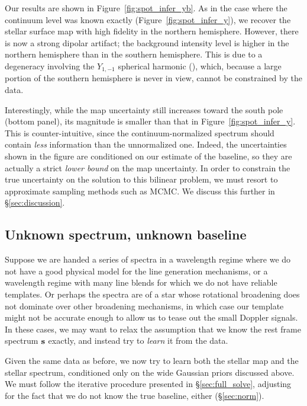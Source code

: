 \documentclass[modern]{aastex631}
\begin{document}
Our results are shown in Figure~\ref{fig:spot_infer_yb}. As in the case where the continuum level was known exactly (Figure~\ref{fig:spot_infer_y}), we recover the stellar surface map with high fidelity in the northern hemisphere. However, there is now a strong dipolar artifact; the background intensity level is higher in the northern hemisphere than in the southern hemisphere. This is due to a degeneracy involving the $Y_{1,-1}$ spherical harmonic (), which, because a large portion of the southern hemisphere is never in view, cannot be constrained by the data.

Interestingly, while the map uncertainty still increases toward the south pole (bottom panel), its magnitude is smaller than that in Figure~\ref{fig:spot_infer_y}. This is counter-intuitive, since the continuum-normalized spectrum should contain \emph{less} information than the unnormalized one. Indeed, the uncertainties shown in the figure are conditioned on our estimate of the baseline, so they are actually a strict \emph{lower bound} on the map uncertainty.
In order to constrain the true uncertainty on the solution to this bilinear problem, we must resort to approximate sampling methods such as MCMC. 
We discuss this further in \S\ref{sec:discussion}.

\subsection{Unknown spectrum, unknown baseline}
\label{sec:spot_y1bs}
%
Suppose we are handed a series of spectra in a wavelength regime where we do not have a good physical model for the line generation mechanisms, or a wavelength regime with many line blends for which we do not have reliable templates. 
Or perhaps the spectra are of a star whose rotational broadening does not dominate over other broadening mechanisms, in which case our template might not be accurate enough to allow us to tease out the small Doppler signals. 
In these cases, we may want to relax the assumption that we know the rest frame spectrum ${\mathbf{s}}$ exactly, and instead try to \emph{learn} it from the data.

Given the same data as before, we now try to learn both the stellar map and the stellar spectrum, conditioned only on the wide Gaussian priors discussed above. 
We must follow the iterative procedure presented in
\S\ref{sec:full_solve}, adjusting for the fact that we do not know the true baseline, either (\S\ref{sec:norm}).
\end{document}
